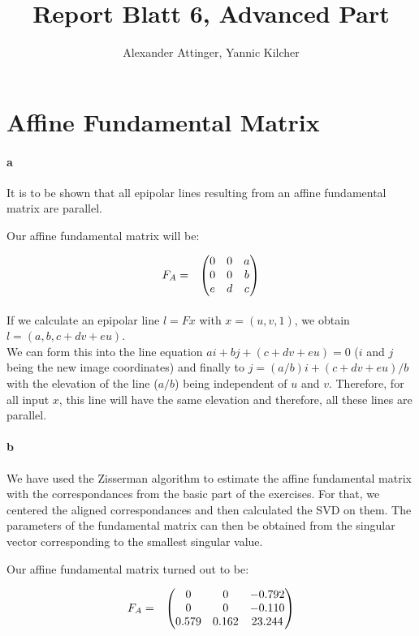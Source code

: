 \documentclass[11pt,a4paper]{article}
\author{Alexander Attinger, Yannic Kilcher}
\title{Report Blatt 6, Advanced Part}
\begin{document}
\maketitle

\section{Affine Fundamental Matrix}
\paragraph{a}
It is to be shown that all epipolar lines resulting from an affine fundamental matrix are parallel.

Our affine fundamental matrix will be:

\[
\begin{array}{lc}
F_{A} = & \left(\begin{array}{@{}ccc@{}}
                    0 & 0 & a \\
                    0 & 0 & b \\
                    e & d & c
                  \end{array}\right)\\ [15pt]
  
\end{array} 
\]

If we calculate an epipolar line $l=Fx$ with $x=(u,v,1)$, we obtain $l=(a,b,c+dv+eu)$.\\
We can form this into the line equation $ai+bj+(c+dv+eu) = 0$ ($i$ and $j$ being the new image coordinates) and finally to $j=(a/b)i + (c+dv+eu)/b$ with the elevation of the line ($a/b$) being independent of $u$ and $v$.
Therefore, for all input $x$, this line will have the same elevation and therefore, all these lines are parallel.

\paragraph{b}
We have used the Zisserman algorithm to estimate the affine fundamental matrix with the correspondances from the basic part of the exercises.
For that, we centered the aligned correspondances and then calculated the SVD on them. The parameters of the fundamental matrix can then be obtained
from the singular vector corresponding to the smallest singular value.

Our affine fundamental matrix turned out to be:

\[
\begin{array}{lc}
F_{A} = & \left(\begin{array}{@{}ccc@{}}
                    0 & 0 & -0.792 \\
                    0 & 0 & -0.110 \\
                    0.579 & 0.162 & 23.244
                  \end{array}\right)\\ [15pt]
  
\end{array} 
\]
\end{document}
